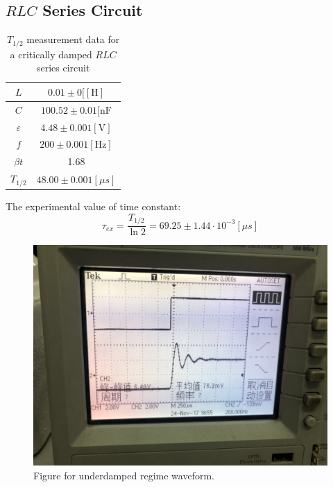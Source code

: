 \documentclass[12pt]{article}
\begin{document}
\subsection{$RLC$ Series Circuit}
\begin{table}[H]
\centering
\begin{tabular}{|c|c|}
\hline
$L$&$0.01\pm0[\mathrm{[H]}$\\ \hline
$C$&$100.52\pm0.01[\mathrm{nF}$\\ \hline
$\varepsilon$&$4.48\pm0.001[\mathrm{V}]$\\ \hline
$f$&$200\pm0.001[\mathrm{Hz}]$\\ \hline
$\beta t$&1.68\\ \hline
$T_{1/2}$&$48.00\pm0.001[\mu s]$\\ \hline
\end{tabular}
\caption{$T_{1/2}$ measurement data for a critically damped $RLC$ series circuit}
\end{table}
\par The experimental value of time constant:
$$\tau_{ex}=\frac{T_{1/2}}{\ln2}=69.25\pm1.44\cdot10^{-3}[\mu s]$$
\begin{figure}[H]
\centering
\includegraphics[scale=0.25]{P7.jpg}
\caption{Figure for underdamped regime waveform.}
\end{figure}
\end{document}
